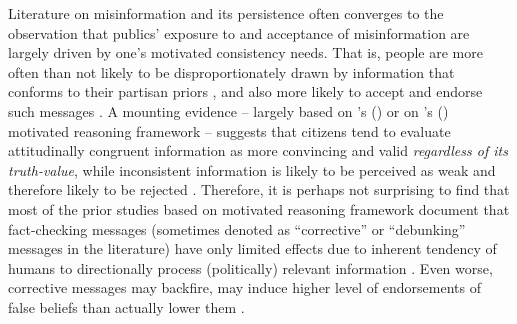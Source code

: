 \documentclass[man, 12pt, a4paper]{apa6}
\begin{document}
      Literature on misinformation and its persistence often converges to the observation that publics' exposure to and acceptance of misinformation are largely driven by one's motivated consistency needs. That is, people are more often than not likely to be disproportionately drawn by information that conforms to their partisan priors \parencite{guess2018selective, weeks2014electoral}, and also more likely to accept and endorse such messages \parencite{kunda1990,nyhan2010corrections}. A mounting evidence -- largely based on \citeauthor{kunda1990}'s (\citeyear{kunda1990}) or on \citeauthor{taber2006}'s (\citeyear{taber2006}) motivated reasoning framework -- suggests that citizens tend to evaluate attitudinally congruent information as more convincing and valid \emph{regardless of its truth-value}, while inconsistent information is likely to be perceived as weak and therefore likely to be rejected \parencite{taber2006,weeks2015emotions}. Therefore, it is perhaps not surprising to find that most of the prior studies based on motivated reasoning framework document that fact-checking messages (sometimes denoted as \enquote{corrective} or \enquote{debunking} messages in the literature) have only limited effects due to inherent tendency of humans to directionally process (politically) relevant information \parencite{thorson_2016, taber2006,flynn2017nature}. Even worse, corrective messages may backfire, may induce higher level of endorsements of false beliefs than actually lower them \parencites[e.g.,][]{nyhan2010corrections}[but see][]{Wood2018}.
      
\end{document}
